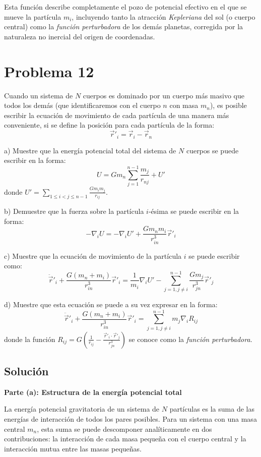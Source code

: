 \documentclass[12pt, letterpaper]{article}
\begin{document}
Esta función describe completamente el pozo de potencial efectivo en el que se mueve la partícula $m_i$, incluyendo tanto la atracción \textit{Kepleriana} del sol (o cuerpo central) como la \textit{función perturbadora} de los demás planetas, corregida por la naturaleza no inercial del origen de coordenadas.


\section{Problema 12}

Cuando un sistema de $N$ cuerpos es dominado por un cuerpo más masivo que todos los demás (que identificaremos con el cuerpo $n$ con masa $m_n$), es posible escribir la ecuación de movimiento de cada partícula de una manera más conveniente, si se define la posición para cada partícula de la forma:
$$ \vec{r}'_i = \vec{r}_i - \vec{r}_n $$

a) Muestre que la energía potencial total del sistema de $N$ cuerpos se puede escribir en la forma:
$$ U = G m_n \sum_{j=1}^{n-1} \frac{m_j}{r_{nj}} + U' $$
donde $U' = \sum_{1 \leq i < j \leq n-1} \frac{G m_i m_j}{r_{ij}}$.

b) Demuestre que la fuerza sobre la partícula $i$-ésima se puede escribir en la forma:
$$ -\nabla_i U = -\nabla_i U' + \frac{G m_n m_i}{r_{in}^3} \vec{r}'_i $$

c) Muestre que la ecuación de movimiento de la partícula $i$ se puede escribir como:
$$ \ddot{\vec{r}}'_i + \frac{G(m_n + m_i)}{r_{in}^3} \vec{r}'_i = \frac{1}{m_i} \nabla_i U' - \sum_{j=1, j \neq i}^{n-1} \frac{G m_j}{r_{jn}^3} \vec{r}'_j $$

d) Muestre que esta ecuación se puede a su vez expresar en la forma:
$$ \ddot{\vec{r}}'_i + \frac{G(m_n + m_i)}{r_{in}^3} \vec{r}'_i = \sum_{j=1, j \neq i}^{n-1} m_j \nabla_i R_{ij} $$
donde la función $R_{ij} = G \left( \frac{1}{r_{ij}} - \frac{\vec{r}'_i \cdot \vec{r}'_j}{r_{jn}^3} \right)$ se conoce como la \textit{función perturbadora}.


\subsection{Solución}

\textbf{Parte (a): Estructura de la energía potencial total}

La energía potencial gravitatoria de un sistema de $N$ partículas es la suma de las energías de interacción de todos los pares posibles. Para un sistema con una masa central $m_n$, esta suma se puede descomponer analíticamente en dos contribuciones: la interacción de cada masa pequeña con el cuerpo central y la interacción mutua entre las masas pequeñas.
\end{document}
